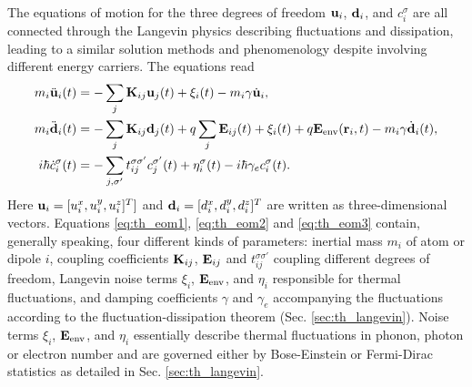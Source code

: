 The equations of motion for the three degrees of freedom $\mathbf{u}_i$, $\mathbf{d}_i$, and $c_i^{\sigma}$ are all connected through the Langevin physics describing fluctuations and dissipation, leading to a similar solution methods and phenomenology despite involving different energy carriers. The equations read  \cite{bolsterli70,rosa10,rosa11,dhar03}
\begin{subequations}
\begin{align}
 m_i \ddot{\mathbf{u}}_i(t) &=  - \sum_j \mathbf{K}_{ij}\mathbf{u}_j(t) + \xi_i(t) - m_i \gamma \dot{\mathbf{u}}_i, \label{eq:th_eom1} \\
 m_i \ddot{\mathbf{d}}_i(t) &= - \sum_j \mathbf{K}_{ij} \mathbf{d}_j(t) +q\sum_{j} \mathbf{E}_{ij}(t)+\xi_i(t)+ q\mathbf{E}_{\textrm{env}}(\mathbf{r}_i,t) - m_i \gamma \dot{\mathbf{d}}_i(t), \label{eq:th_eom2}\\
 i\hbar \dot{c}_i^{\sigma}(t) &= -\sum_{j,\sigma'} t_{ij}^{\sigma\sigma'} c_j^{\sigma'}(t) +\eta_i^{\sigma}(t) - i\hbar \gamma_e c_i^{\sigma}(t) \label{eq:th_eom3}.
\end{align}
\end{subequations}
Here $\mathbf{u}_i=[u_i^{x},u_i^y,u_i^z]^T]$ and $\mathbf{d}_i=[d_i^x,d_i^y,d_i^z]^T$ are written as three-dimensional vectors. Equations \eqref{eq:th_eom1}, \eqref{eq:th_eom2} and \eqref{eq:th_eom3} contain, generally speaking, four different kinds of parameters: inertial mass $m_i$ of atom or dipole $i$, coupling coefficients $\mathbf{K}_{ij}$, $\mathbf{E}_{ij}$ and $t_{ij}^{\sigma\sigma'}$ coupling different degrees of freedom, Langevin noise terms $\xi_i$, $\mathbf{E}_{\textrm{env}}$, and $\eta_i$ responsible for thermal fluctuations, and damping coefficients $\gamma$ and $\gamma_e$ accompanying the fluctuations according to the fluctuation-dissipation theorem (Sec. \ref{sec:th_langevin}). Noise terms $\xi_i$, $\mathbf{E}_{\textrm{env}}$, and $\eta_i$ essentially describe thermal fluctuations in phonon, photon or electron number and are governed either by Bose-Einstein or Fermi-Dirac statistics as detailed in Sec. \ref{sec:th_langevin}. %

